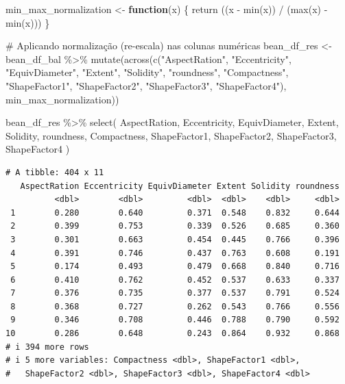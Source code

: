 \documentclass[
  letterpaper,
  DIV=11,
  numbers=noendperiod]{scrartcl}
\newenvironment{Shaded}{\begin{snugshade}}{\end{snugshade}}
\newcommand{\CommentTok}[1]{\textcolor[rgb]{0.37,0.37,0.37}{#1}}
\newcommand{\ControlFlowTok}[1]{\textcolor[rgb]{0.00,0.23,0.31}{\textbf{#1}}}
\newcommand{\FunctionTok}[1]{\textcolor[rgb]{0.28,0.35,0.67}{#1}}
\newcommand{\NormalTok}[1]{\textcolor[rgb]{0.00,0.23,0.31}{#1}}
\newcommand{\OtherTok}[1]{\textcolor[rgb]{0.00,0.23,0.31}{#1}}
\newcommand{\SpecialCharTok}[1]{\textcolor[rgb]{0.37,0.37,0.37}{#1}}
\newcommand{\StringTok}[1]{\textcolor[rgb]{0.13,0.47,0.30}{#1}}
\begin{document}
\begin{Shaded}
\begin{Highlighting}[]
\NormalTok{min\_max\_normalization }\OtherTok{\textless{}{-}} \ControlFlowTok{function}\NormalTok{(x) \{}
  \FunctionTok{return}\NormalTok{ ((x }\SpecialCharTok{{-}} \FunctionTok{min}\NormalTok{(x)) }\SpecialCharTok{/}\NormalTok{ (}\FunctionTok{max}\NormalTok{(x) }\SpecialCharTok{{-}} \FunctionTok{min}\NormalTok{(x)))}
\NormalTok{\}}

\CommentTok{\# Aplicando normalização (re{-}escala) nas colunas numéricas}
\NormalTok{bean\_df\_res }\OtherTok{\textless{}{-}}\NormalTok{ bean\_df\_bal }\SpecialCharTok{\%\textgreater{}\%} 
  \FunctionTok{mutate}\NormalTok{(}\FunctionTok{across}\NormalTok{(}\FunctionTok{c}\NormalTok{(}\StringTok{"AspectRation"}\NormalTok{, }\StringTok{"Eccentricity"}\NormalTok{, }\StringTok{"EquivDiameter"}\NormalTok{, }\StringTok{"Extent"}\NormalTok{, }\StringTok{"Solidity"}\NormalTok{, }\StringTok{"roundness"}\NormalTok{, }\StringTok{"Compactness"}\NormalTok{, }\StringTok{"ShapeFactor1"}\NormalTok{, }\StringTok{"ShapeFactor2"}\NormalTok{, }\StringTok{"ShapeFactor3"}\NormalTok{, }\StringTok{"ShapeFactor4"}\NormalTok{), min\_max\_normalization))}

\NormalTok{bean\_df\_res }\SpecialCharTok{\%\textgreater{}\%} 
  \FunctionTok{select}\NormalTok{(}
\NormalTok{    AspectRation, }
\NormalTok{    Eccentricity, }
\NormalTok{    EquivDiameter, }
\NormalTok{    Extent, }
\NormalTok{    Solidity, }
\NormalTok{    roundness, }
\NormalTok{    Compactness, }
\NormalTok{    ShapeFactor1, }
\NormalTok{    ShapeFactor2, }
\NormalTok{    ShapeFactor3, }
\NormalTok{    ShapeFactor4}
\NormalTok{  )}
\end{Highlighting}
\end{Shaded}

\begin{verbatim}
# A tibble: 404 x 11
   AspectRation Eccentricity EquivDiameter Extent Solidity roundness
          <dbl>        <dbl>         <dbl>  <dbl>    <dbl>     <dbl>
 1        0.280        0.640         0.371  0.548    0.832     0.644
 2        0.399        0.753         0.339  0.526    0.685     0.360
 3        0.301        0.663         0.454  0.445    0.766     0.396
 4        0.391        0.746         0.437  0.763    0.608     0.191
 5        0.174        0.493         0.479  0.668    0.840     0.716
 6        0.410        0.762         0.452  0.537    0.633     0.337
 7        0.376        0.735         0.377  0.537    0.791     0.524
 8        0.368        0.727         0.262  0.543    0.766     0.556
 9        0.346        0.708         0.446  0.788    0.790     0.592
10        0.286        0.648         0.243  0.864    0.932     0.868
# i 394 more rows
# i 5 more variables: Compactness <dbl>, ShapeFactor1 <dbl>,
#   ShapeFactor2 <dbl>, ShapeFactor3 <dbl>, ShapeFactor4 <dbl>
\end{verbatim}
\end{document}
